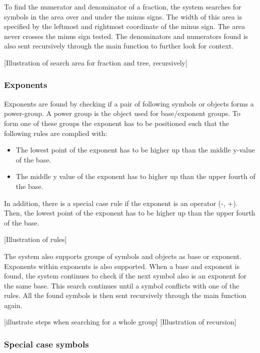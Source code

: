 To find the numerator and denominator of a fraction, the system searches for symbols in the area over and under the minus signs. The width of this area is specified by the leftmost and rightmost coordinate of the minus sign. The area never crosses the minus sign tested. The denominators and numerators found is also sent recursively through the main function to further look for context.

[Illustration of search area for fraction and tree, recursively]

\subsubsection{Exponents}
\label{interpretation-exponents}

Exponents are found by checking if a pair of following symbols or objects forms a power-group. A power group is the object used for base/exponent groups. To form one of these groups the exponent has to be positioned such that the following rules are complied with:

\begin{itemize}
    \setlength\itemsep{0em}
    \item The lowest point of the exponent has to be higher up than the middle y-value of the base.
    \item The middle y value of the exponent has to higher up than the upper fourth of the base.
\end{itemize}

In addition, there is a special case rule if the exponent is an operator (-, +). Then, the lowest point of the exponent has to be higher up than the upper fourth of the base.

[Illustration of rules]

The system also supports groups of symbols and objects as base or exponent. Exponents within exponents is also supported. When a base and exponent is found, the system continues to check if the next symbol also is an exponent for the same base. This search continues until a symbol conflicts with one of the rules. All the found symbols is then sent recursively through the main function again.

[illustrate steps when searching for a whole group]
[Illustration of recursion]


\subsubsection{Special case symbols}
\label{interpretation-special-symbols}


